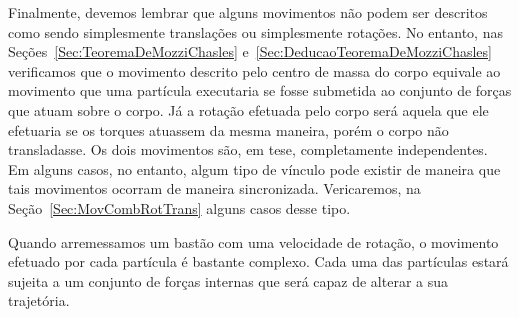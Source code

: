 
Finalmente, devemos lembrar que alguns movimentos não podem ser descritos como sendo simplesmente translações ou simplesmente rotações. No entanto, nas Seções~\ref{Sec:TeoremaDeMozziChasles} e~\ref{Sec:DeducaoTeoremaDeMozziChasles} verificamos que o movimento descrito pelo centro de massa do corpo equivale ao movimento que uma partícula executaria se fosse submetida ao conjunto de forças que atuam sobre o corpo. Já a rotação efetuada pelo corpo será aquela que ele efetuaria se os torques atuassem da mesma maneira, porém o corpo não transladasse. Os dois movimentos são, em tese, completamente independentes. Em alguns casos, no entanto, algum tipo de vínculo pode existir de maneira que tais movimentos ocorram de maneira sincronizada. Vericaremos, na Seção~\ref{Sec:MovCombRotTrans} alguns casos desse tipo.

\begin{marginfigure}
\centering
{}
\caption{Quando arremessamos um bastão com uma velocidade de rotação, o movimento efetuado por cada partícula é bastante complexo. Cada uma das partículas estará sujeita a um conjunto de forças internas que será capaz de alterar a sua trajetória. \label{Fig:LancamentoObliquoCorpoGirando}}
\end{marginfigure}

